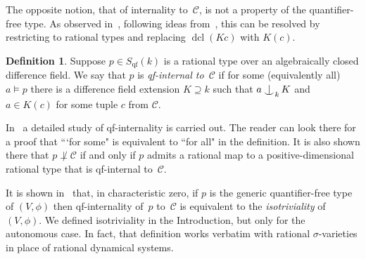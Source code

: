 \documentclass[\DocOpts]{amsart}
\theoremstyle{definition}
\newtheorem{definition}[theorem]{Definition}
\def\qf{\operatorname{qf}}
\def\dcl{\operatorname{dcl}}
\def\C{\mathcal{C}}
\newcommand{\<}{\langle}
\renewcommand{\>}{\rangle}
\def\Ind#1#2{#1\setbox0=\hbox{\(#1x\)}\kern\wd0\hbox to 
0pt{\hss\(#1\mid\)\hss}\lower.9\ht0\hbox to 
0pt{\hss\(#1\smile\)\hss}\kern\wd0}
\def\ind{\mathop{\mathpalette\Ind{}}}
\begin{document}
The opposite notion, that of internality to~$\C$, is not a property of the quantifier-free type.
As observed in~\cite[$\S$2.4]{qfint}, following ideas from~\cite[$\S$5]{acfa}, this can be resolved by restricting to rational types and replacing $\dcl(Kc)$ with $K(c)$.

\begin{definition}
\label{def:qfint}
Suppose $p\in S_{\qf}(k)$ is a rational type over an algebraically closed difference field.
We say that $p$ is {\em qf-internal to~$\C$} if for some (equivalently all) $a\models p$ there is a difference field extension $K\supseteq k$ such that $a\ind_kK$ and $a\in K(c)$ for some tuple $c$ from $\C$.
\end{definition}

In~\cite[$\S$2.4]{qfint} a detailed study of qf-internality is carried out.
The reader can look there for a proof that ```for some" is equivalent to ``for all" in the definition.
It is also shown there that $p\not\perp\C$ if and only if $p$ admits a rational map to a positive-dimensional rational type that is qf-internal to~$\C$.

It is shown in~\cite[Proposition~3.6]{qfint} that, in characteristic zero, if $p$ is the generic quantifier-free type of $(V,\phi)$ then qf-internality of~$p$ to~$\C$ is equivalent to the {\em isotriviality} of~$(V,\phi)$.
We defined isotriviality in the Introduction, but only for the autonomous case.
In fact, that definition works verbatim with rational $\sigma$-varieties in place of rational dynamical systems.
\end{document}
